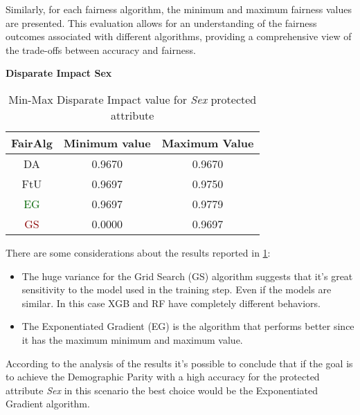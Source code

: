 Similarly, for each fairness algorithm, the minimum and maximum fairness values are presented. This evaluation allows for an understanding of the fairness outcomes associated with different algorithms, providing a comprehensive view of the trade-offs between accuracy and fairness.

\textbf{Disparate Impact Sex}
\begin{table}
    \centering
    \begin{tabular}{|c|c|c|}
        \hline
        \textbf{FairAlg} & \textbf{Minimum value} & \textbf{Maximum Value} \\
        \hline
        DA & 0.9670 & 0.9670 \\
        \hline
        FtU & 0.9697 & 0.9750 \\
        \hline
        \textcolor{darkgreen}{EG} & 0.9697 & 0.9779 \\
        \hline
        \textcolor{darkred}{GS} & 0.0000 & 0.9697 \\
        \hline
    \end{tabular}
    \caption{Min-Max Disparate Impact value for \emph{Sex} protected attribute}
    \label{tab:s_di}
\end{table}

There are some considerations about the results reported in \cref{tab:s_di}:

\begin{itemize}

    \item The huge variance for the Grid Search (GS) algorithm suggests that it's great sensitivity to the model used in the training step. Even if the models are similar. In this case XGB and RF have completely different behaviors.

    \item The Exponentiated Gradient (EG) is the algorithm that performs better since it has the maximum minimum and maximum value.

\end{itemize}

According to the analysis of the results it's possible to conclude that if the goal is to achieve the Demographic Parity with a high accuracy for the protected attribute \emph{Sex} in this scenario the best choice would be the Exponentiated Gradient algorithm.


